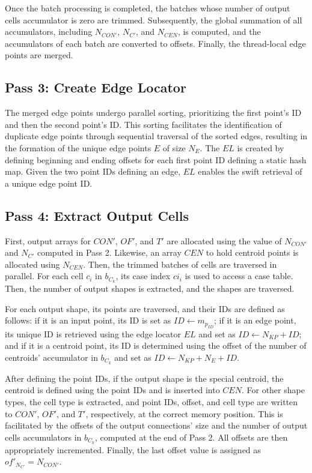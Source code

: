 \documentclass{egpubl}
\begin{document}
Once the batch processing is completed, the batches whose number of output cells accumulator is zero are trimmed. Subsequently, the global summation of all accumulators, including $N_{CON'}$, $N_{C'}$, and $N_{CEN}$, is computed, and the accumulators of each batch are converted to offsets. Finally, the thread-local edge points are merged.

\subsection{Pass 3: Create Edge Locator}

The merged edge points undergo parallel sorting, prioritizing the first point's ID and then the second point's ID. This sorting facilitates the identification of duplicate edge points through sequential traversal of the sorted edges, resulting in the formation of the unique edge points $E$ of size $N_E$. The $EL$ is created by defining beginning and ending offsets for each first point ID defining a static hash map. Given the two point IDs defining an edge, $EL$  enables the swift retrieval of a unique edge point ID.

\subsection{Pass 4: Extract Output Cells}

First, output arrays for $CON'$, $OF'$, and $T'$ are allocated using the value of $N_{CON'}$ and $N_{C'}$ computed in Pass 2. Likewise, an array $CEN$ to hold centroid points is allocated using $N_{CEN}$. Then, the trimmed batches of cells are traversed in parallel. For each cell $c_i$ in $b_{C_k}$, its case index $ci_i$ is used to access a case table. Then, the number of output shapes is extracted, and the shapes are traversed.

For each output shape, its points are traversed, and their IDs are defined as follows: if it is an input point, its ID is set as $ID \gets m_{p_{ID}}$; if it is an edge point, its unique ID is retrieved using the edge locator $EL$ and set as $ID \gets N_{KP} + ID$; and if it is a centroid point, its ID is determined using the offset of the number of centroids' accumulator in $b_{C_k}$ and set as $ID \gets N_{KP} + N_E + ID$.

After defining the point IDs, if the output shape is the special centroid, the centroid is defined using the point IDs and is inserted into $CEN$. For other shape types, the cell type is extracted, and point IDs, offset, and cell type are written to $CON'$, $OF'$, and $T'$, respectively, at the correct memory position. This is facilitated by the offsets of the output connections' size and the number of output cells accumulators in $b_{C_k}$, computed at the end of Pass 2. All offsets are then appropriately incremented. Finally, the last offset value is assigned as $of'_{N_{C'}} =N_{CON'}$.
\end{document}
